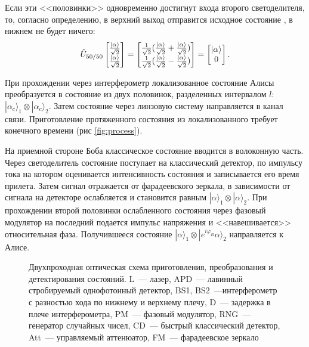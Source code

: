 Если эти <<половинки>> одновременно достигнут входа второго светоделителя, то, согласно определению, в верхний выход отправится исходное состояние \state{\alpha}, в нижнем не будет ничего:
\begin{equation}
  \hat{U}_{50/50} 
  \begin{bmatrix}
    \frac{\left| \alpha \right\rangle}{\sqrt{2}} \\
    \frac{\left| \alpha \right\rangle}{\sqrt{2}}
  \end{bmatrix}  
  =
  \begin{bmatrix}
    \frac{1}{\sqrt{2}}(\frac{\left| \alpha \right\rangle}{\sqrt{2}}+\frac{\left| \alpha \right\rangle}{\sqrt{2}}) \\
    \frac{1}{\sqrt{2}}(\frac{\left| \alpha \right\rangle}{\sqrt{2}}-\frac{\left| \alpha \right\rangle}{\sqrt{2}})
  \end{bmatrix}
  =
  \begin{bmatrix}
    \left| \alpha \right\rangle \\
    0
  \end{bmatrix}.
\end{equation}

При прохождении через интерферометр локализованное состояние Алисы преобразуется в состояние из двух половинок, разделенных интервалом $l$: $|\alpha_c\rangle_1 \otimes |\alpha_c\rangle_2$. 
Затем состояние через линзовую систему направляется в канал связи. Приготовление протяженного состояния из локализованного требует конечного времени (рис \ref{fig:process}).

На приемной стороне Боба классическое состояние вводится в волоконную часть. 
Через светоделитель состояние поступает на классический детектор, по импульсу тока на котором оценивается интенсивность состояния и записывается его время прилета. 
Затем сигнал отражается от фарадеевского зеркала, в зависимости от сигнала на детекторе ослабляется и становится равным $|\alpha\rangle_1 \otimes |\alpha\rangle_2$.
При прохождении второй половинки ослабленного состояния через фазовый модулятор на последний подается импульс напряжения и <<навешивается>> относительная фаза.
Получившееся состояние $|\alpha\rangle_1 \otimes |e^{i\varphi_B}\alpha\rangle_2$ направляется к Алисе.

\begin{figure}[h]
\caption{
Двухпроходная оптическая схема приготовления, преобразования и детектирования состояний.
L~--- лазер, APD~--- лавинный стробируемый однофотонный детектор, BS1, BS2~---интерферометр с разностью хода по нижнему и верхнему плечу,
D~--- задержка в плече интерферометра, PM~--- фазовый модулятор, RNG~--- генератор случайных чисел,
CD~--- быстрый классический детектор, Att~--- управляемый аттенюатор, FM~--- фарадеевское зеркало
}
\label{fig:scheme}
\end{figure}

